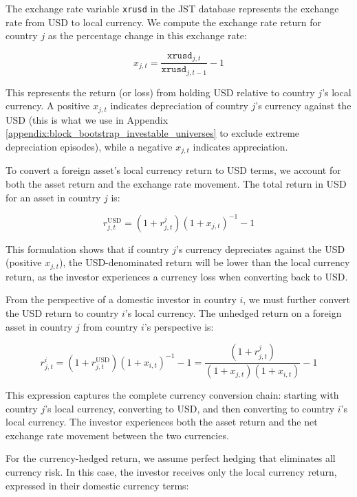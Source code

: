 \documentclass[11pt]{article}
\begin{document}
The exchange rate variable \texttt{xrusd} in the JST database represents the exchange rate from USD to local currency. We compute the exchange rate return for country $j$ as the percentage change in this exchange rate:

\begin{equation}\label{eq:exchange_rate_return}
  x_{j,t} = \frac{\texttt{xrusd}_{j,t}}{\texttt{xrusd}_{j,t-1}} - 1
\end{equation}

This represents the return (or loss) from holding USD relative to country $j$'s local currency. A positive $x_{j,t}$ indicates depreciation of country $j$'s currency against the USD (this is what we use in Appendix \ref{appendix:block_bootstrap_investable_universes} to exclude extreme depreciation episodes), while a negative $x_{j,t}$ indicates appreciation.

To convert a foreign asset's local currency return to USD terms, we account for both the asset return and the exchange rate movement. The total return in USD for an asset in country $j$ is:

\begin{equation}\label{eq:foreign_return_usd}
  r^{\text{USD}}_{j,t} = (1 + r^{j}_{j,t})(1 + x_{j,t})^{-1} - 1
\end{equation}

This formulation shows that if country $j$'s currency depreciates against the USD (positive $x_{j,t}$), the USD-denominated return will be lower than the local currency return, as the investor experiences a currency loss when converting back to USD.

From the perspective of a domestic investor in country $i$, we must further convert the USD return to country $i$'s local currency. The unhedged return on a foreign asset in country $j$ from country $i$'s perspective is:

\begin{equation}\label{eq:foreign_return_domestic}
  r^{i}_{j,t} = (1 + r^{\text{USD}}_{j,t})(1 + x_{i,t})^{-1} - 1 = \frac{(1 + r^{j}_{j,t})}{(1 + x_{j,t})(1 + x_{i,t})} - 1
\end{equation}

This expression captures the complete currency conversion chain: starting with country $j$'s local currency, converting to USD, and then converting to country $i$'s local currency. The investor experiences both the asset return and the net exchange rate movement between the two currencies.

For the currency-hedged return, we assume perfect hedging that eliminates all currency risk. In this case, the investor receives only the local currency return, expressed in their domestic currency terms:
\end{document}
